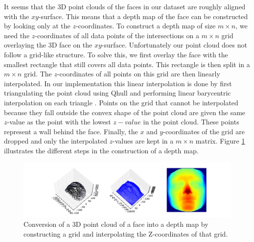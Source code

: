 \documentclass[]{article}
\begin{document}
It seems that the 3D point clouds of the faces in our dataset are roughly aligned with the $xy$-surface. This means that a depth map of the face can be constructed by looking only at the $z$-coordinates. To construct a depth map of size $m \times n$, we need the $z$-coordinates of all data points of the intersections on a $m \times n$ grid overlaying the 3D face on the $xy$-surface. Unfortunately our point cloud does not follow a grid-like structure. To solve this, we first overlay the face with the smallest rectangle that still covers all data points. This rectangle is then split in a  $m \times n$ grid. The $z$-coordinates of all points on this grid are then linearly interpolated. In our implementation this linear interpolation is done by first triangulating the point cloud using Qhull and performing linear barycentric interpolation on each triangle \cite{linearinerpolator2016}.
Points on the grid that cannot be interpolated because they fall outside the convex shape of the point cloud are given the same $z$-value as the point with the lowest $z-value$ in the point cloud. These points represent a wall behind the face. Finally, the $x$ and $y$-coordinates of the grid are dropped and only the interpolated $z$-values are kept in a $m \times n$ matrix. Figure \ref{fig:depthmap-generation} illustrates the different steps in the construction of a depth map.
\begin{figure}
	\centering
	\includegraphics[width=\textwidth]{depthmapgeneration.pdf}
	\caption{Conversion of a 3D point cloud of a face into a depth map by constructing a grid and interpolating the Z-coordinates of that grid.}
	\label{fig:depthmap-generation}
\end{figure}


\end{document}

